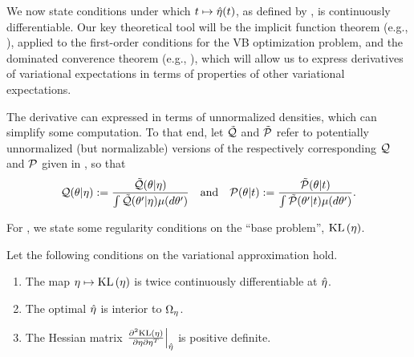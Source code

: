 We now state conditions under which $t \mapsto \hat\eta(t)$, as defined by
, is continuously differentiable.  Our key theoretical tool will
be the implicit function theorem (e.g., \citet{krantz:2012:implicit}), applied
to the first-order conditions for the VB optimization problem, and the dominated
converence theorem (e.g., \citet[Theorem 16.8]{billingsley:1986:probability}),
which will allow us to express derivatives of variational expectations in terms
of properties  of other variational expectations.

The derivative can expressed in terms of unnormalized densities, which can
simplify some computation.  To that end, let $\tilde{\mathcal{Q}}$ and $\tilde{\mathcal{P}}$ refer to
potentially unnormalized (but normalizable) versions of the respectively
corresponding $\mathcal{Q}$ and $\mathcal{P}$ given in , so that
%
\begin{align*}
%
\q(\theta \vert \eta) :={}
    \frac{\qtil(\theta \vert \eta)}
    {\int \qtil(\theta' \vert \eta) \mu(d\theta')} \mathand
\p(\theta \vert \t) :={}
    \frac{\ptil(\theta \vert \t)}
    {\int \ptil(\theta' \vert \t) \mu(d\theta')}.
%
\end{align*}

For , we state some regularity conditions on the ``base
problem'', $\mathrm{KL}\left(\eta\right)$.

\begin{assu}
%
Let the following conditions on the variational approximation hold.
%
\begin{enumerate}
%
    \item {} The map $\eta \mapsto \mathrm{KL}\left(\eta\right)$ is twice
    continuously differentiable at $\hat\eta$.

    \item {} The optimal $\hat\eta$ is interior
    to $\Omega_{\eta}$.

    \item{} The Hessian matrix $\left.\frac{\partial^2 \mathrm{KL}\left(\eta\right)}{\partial \eta \partial \eta^T}\right\vert_{\hat\eta}$ is positive definite.

%
\end{enumerate}
%
\end{assu}

